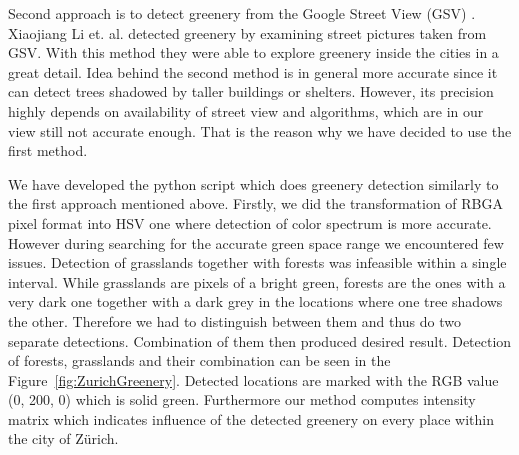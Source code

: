 \documentclass[letterpaper]{article}
\begin{document}
\indent Second approach is to detect greenery from the Google Street View (GSV) \cite{googleView}. Xiaojiang Li et. al. detected greenery by examining street
pictures taken from GSV. With this method they were able to explore greenery inside the cities in a great detail. Idea behind the second method is in general
more accurate since it can detect trees shadowed by taller buildings or shelters. However, its precision highly depends on availability of street view and
algorithms, which are in our view still not accurate enough. That is the reason why we have decided to use the first method.

\indent We have developed the python script which does greenery detection similarly to the first approach mentioned above. 
Firstly, we did the transformation of RBGA pixel format into HSV one where detection of color spectrum is more accurate.
However during searching for the accurate green space range we encountered few issues. Detection of grasslands together 
with forests was infeasible within a single interval. While grasslands are pixels of a bright green, forests are 
the ones with a very dark one together with a dark grey in the locations where one tree shadows the other. 
Therefore we had to distinguish between them and thus do two separate detections. Combination of them then 
produced desired result. Detection of forests, grasslands and their combination can be seen in the Figure~\ref{fig:ZurichGreenery}.
Detected locations are marked with the RGB value (0, 200, 0) which is solid green. Furthermore our method computes intensity matrix 
which indicates influence of the detected greenery on every place within the city of Zürich.
\end{document}
